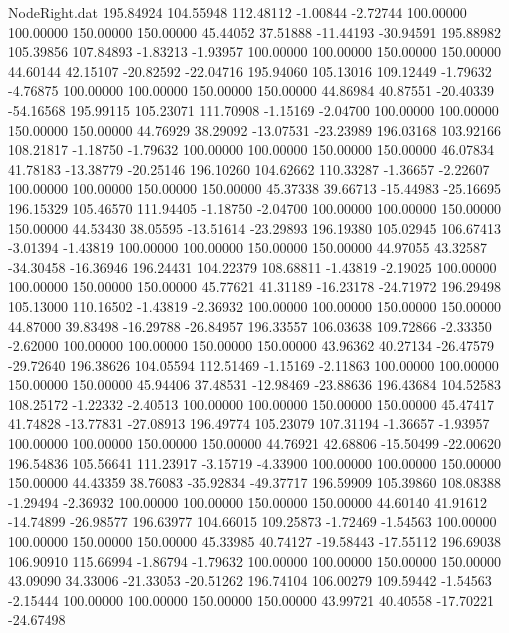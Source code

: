 \begin{filecontents}{NodeRight.dat}
 195.84924  104.55948  112.48112    -1.00844   -2.72744  100.00000  100.00000  150.00000  150.00000   45.44052   37.51888  -11.44193  -30.94591
 195.88982  105.39856  107.84893    -1.83213   -1.93957  100.00000  100.00000  150.00000  150.00000   44.60144   42.15107  -20.82592  -22.04716
 195.94060  105.13016  109.12449    -1.79632   -4.76875  100.00000  100.00000  150.00000  150.00000   44.86984   40.87551  -20.40339  -54.16568
 195.99115  105.23071  111.70908    -1.15169   -2.04700  100.00000  100.00000  150.00000  150.00000   44.76929   38.29092  -13.07531  -23.23989
 196.03168  103.92166  108.21817    -1.18750   -1.79632  100.00000  100.00000  150.00000  150.00000   46.07834   41.78183  -13.38779  -20.25146
 196.10260  104.62662  110.33287    -1.36657   -2.22607  100.00000  100.00000  150.00000  150.00000   45.37338   39.66713  -15.44983  -25.16695
 196.15329  105.46570  111.94405    -1.18750   -2.04700  100.00000  100.00000  150.00000  150.00000   44.53430   38.05595  -13.51614  -23.29893
 196.19380  105.02945  106.67413    -3.01394   -1.43819  100.00000  100.00000  150.00000  150.00000   44.97055   43.32587  -34.30458  -16.36946
 196.24431  104.22379  108.68811    -1.43819   -2.19025  100.00000  100.00000  150.00000  150.00000   45.77621   41.31189  -16.23178  -24.71972
 196.29498  105.13000  110.16502    -1.43819   -2.36932  100.00000  100.00000  150.00000  150.00000   44.87000   39.83498  -16.29788  -26.84957
 196.33557  106.03638  109.72866    -2.33350   -2.62000  100.00000  100.00000  150.00000  150.00000   43.96362   40.27134  -26.47579  -29.72640
 196.38626  104.05594  112.51469    -1.15169   -2.11863  100.00000  100.00000  150.00000  150.00000   45.94406   37.48531  -12.98469  -23.88636
 196.43684  104.52583  108.25172    -1.22332   -2.40513  100.00000  100.00000  150.00000  150.00000   45.47417   41.74828  -13.77831  -27.08913
 196.49774  105.23079  107.31194    -1.36657   -1.93957  100.00000  100.00000  150.00000  150.00000   44.76921   42.68806  -15.50499  -22.00620
 196.54836  105.56641  111.23917    -3.15719   -4.33900  100.00000  100.00000  150.00000  150.00000   44.43359   38.76083  -35.92834  -49.37717
 196.59909  105.39860  108.08388    -1.29494   -2.36932  100.00000  100.00000  150.00000  150.00000   44.60140   41.91612  -14.74899  -26.98577
 196.63977  104.66015  109.25873    -1.72469   -1.54563  100.00000  100.00000  150.00000  150.00000   45.33985   40.74127  -19.58443  -17.55112
 196.69038  106.90910  115.66994    -1.86794   -1.79632  100.00000  100.00000  150.00000  150.00000   43.09090   34.33006  -21.33053  -20.51262
 196.74104  106.00279  109.59442    -1.54563   -2.15444  100.00000  100.00000  150.00000  150.00000   43.99721   40.40558  -17.70221  -24.67498

\end{filecontents}
